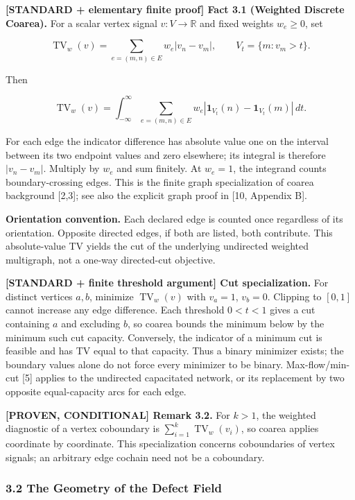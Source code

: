 \documentclass[
  11pt,
]{article}
\begin{document}
\textbf{{[}STANDARD + elementary finite proof{]} Fact 3.1 (Weighted
Discrete Coarea).} For a scalar vertex signal \(v:V\to\mathbb R\) and
fixed weights \(w_e\ge0\), set

\[
\operatorname{TV}_w(v)=\sum_{e=(m,n)\in E}w_e|v_n-v_m|,
\qquad V_t=\{m:v_m>t\}.
\]

Then

\[
\operatorname{TV}_w(v)=\int_{-\infty}^{\infty}
\sum_{e=(m,n)\in E}w_e
|\mathbf1_{V_t}(n)-\mathbf1_{V_t}(m)|\,dt.
\]

For each edge the indicator difference has absolute value one on the
interval between its two endpoint values and zero elsewhere; its
integral is therefore \(|v_n-v_m|\). Multiply by \(w_e\) and sum
finitely. At \(w_e=1\), the integrand counts boundary-crossing edges.
This is the finite graph specialization of coarea background {[}2,3{]};
see also the explicit graph proof in {[}10, Appendix B{]}.

\textbf{Orientation convention.} Each declared edge is counted once
regardless of its orientation. Opposite directed edges, if both are
listed, both contribute. This absolute-value TV yields the cut of the
underlying undirected weighted multigraph, not a one-way directed-cut
objective.

\textbf{{[}STANDARD + finite threshold argument{]} Cut specialization.}
For distinct vertices \(a,b\), minimize \(\operatorname{TV}_w(v)\) with
\(v_a=1\), \(v_b=0\). Clipping to \([0,1]\) cannot increase any edge
difference. Each threshold \(0<t<1\) gives a cut containing \(a\) and
excluding \(b\), so coarea bounds the minimum below by the minimum such
cut capacity. Conversely, the indicator of a minimum cut is feasible and
has TV equal to that capacity. Thus a binary minimizer exists; the
boundary values alone do not force every minimizer to be binary.
Max-flow/min-cut {[}5{]} applies to the undirected capacitated network,
or its replacement by two opposite equal-capacity arcs for each edge.

\textbf{{[}PROVEN, CONDITIONAL{]} Remark 3.2.} For \(k>1\), the weighted
diagnostic of a vertex coboundary is
\(\sum_{i=1}^k\operatorname{TV}_w(v_i)\), so coarea applies coordinate
by coordinate. This specialization concerns coboundaries of vertex
signals; an arbitrary edge cochain need not be a coboundary.

\hypertarget{the-geometry-of-the-defect-field}{%
\subsubsection{3.2 The Geometry of the Defect
Field}\label{the-geometry-of-the-defect-field}}
\end{document}
